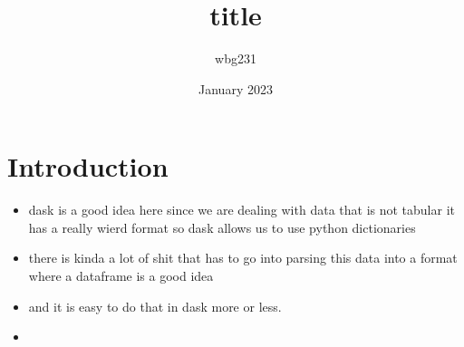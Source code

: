 \documentclass{article}
\title{title }
\author{wbg231 }
\date{January 2023}
\begin{document}
\maketitle

\section{Introduction}
\begin{itemize}
\item dask is a good idea here since we are dealing with data that is not tabular it has a really wierd format so dask allows us to use python dictionaries 
\item there is kinda a lot of shit that has to go into parsing this data into a format where a dataframe is a good idea 
\item and it is easy to do that in dask more or less. 
\item  
\end{itemize}
\end{document}
